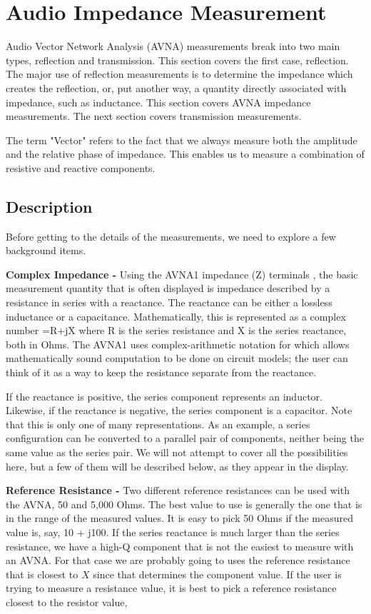\section{Audio Impedance Measurement}
\label{sect:ZMeas}
%
Audio Vector Network Analysis (AVNA) measurements break into two main types,  reflection and transmission.  This section covers the first case, reflection.  The major use of reflection measurements is to determine the impedance
which creates the reflection, or, put another way, a quantity directly associated with impedance, such as inductance. This section covers AVNA impedance measurements. The next section covers transmission measurements.

The term "Vector" refers to the fact that we always measure both the amplitude and the relative phase of impedance.  This enables us to measure a combination of resistive and reactive components.
%
\subsection{Description}
\label{subsect:ZDescr}
Before getting to the details of the measurements, we need to explore a few background items.

\textbf{Complex Impedance - }Using the AVNA1 impedance (Z) terminals , the basic measurement quantity that is often displayed is impedance described by a resistance in series with a reactance. The reactance can be either a lossless inductance or a capacitance. Mathematically, this is represented as a complex number =R+jX where R is the series resistance and X is the series reactance, both in Ohms. The AVNA1 uses complex-arithmetic notation for  which allows mathematically sound computation to be done on circuit models; the user can think of it as a way to keep the resistance separate from the reactance.

If the reactance is positive, the series component represents an inductor. Likewise, if the reactance is negative, the series component is a capacitor.  Note that this is only one of many representations. As an example, a series configuration can be converted to a parallel pair of components, neither being the same value as the series pair.  We will not attempt to cover all the possibilities here, but a few of them will be described below, as they appear in the display.

\textbf{Reference Resistance - }Two different reference resistances can be used with the AVNA, 50 and 5,000 Ohms. The best value to use is generally the one that is in the range of the measured values. It is easy to pick 50 Ohms if the measured value is, say, 10 + j100. If the series reactance is much larger than the series resistance, we have a high-Q component that is not the easiest to measure with an AVNA. For that case we are probably going to uses the reference resistance that is closest to \(X\) since that determines the component value. If the user is trying to measure a resistance value, it is best to pick a reference resistance closest to the resistor value,

